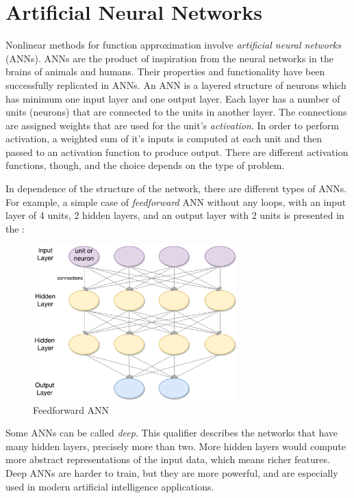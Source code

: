 \section{Artificial Neural Networks}
Nonlinear methods for function approximation involve \textit{artificial neural networks} (ANNs). ANNs are the product of inspiration from the neural networks in the brains of animals and humans. Their properties and functionality have been successfully replicated in ANNs. An ANN is a layered structure of neurons which has minimum one input layer and one output layer. Each layer has a number of units (neurons) that are connected to the units in another layer. The connections are assigned weights that are used for the unit's \textit{activation}. In order to perform activation, a weighted sum of it's inputs is computed at each unit and then passed to an activation function to produce output. There are different activation functions, though, and the choice depends on the type of problem.

In dependence of the structure of the network, there are different types of ANNs. For example, a simple case of \textit{feedforward} ANN without any loops, with an input layer of 4 units, 2 hidden layers, and an output layer with 2 units is presented in the :
\begin{figure}[H]
	\centering
	\includegraphics[width=0.7\textwidth]{Figures/Feedforward}
	\caption{Feedforward ANN}
	\label{fig:feedforward}
\end{figure}
Some ANNs can be called \textit{deep}. This qualifier describes the networks that have many hidden layers, precisely more than two. More hidden layers would compute more abstract representations of the input data, which means richer features. Deep ANNs are harder to train, but they are more powerful, and are especially used in modern artificial intelligence applications.

